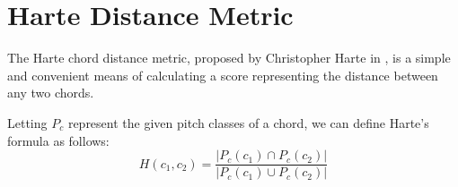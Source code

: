 \section{Harte Distance Metric}

The Harte chord distance metric, proposed by Christopher Harte in \cite{harte2010towards}, is a simple and convenient means of calculating a score representing the distance between any two chords.

Letting $P_c$ represent the given pitch classes of a chord, we can define Harte's formula as follows:
\[ H(c_1,c_2) = \frac{\left| P_c(c_1) \cap P_c(c_2) \right|}{\left| P_c(c_1) \cup P_c(c_2) \right|} \]